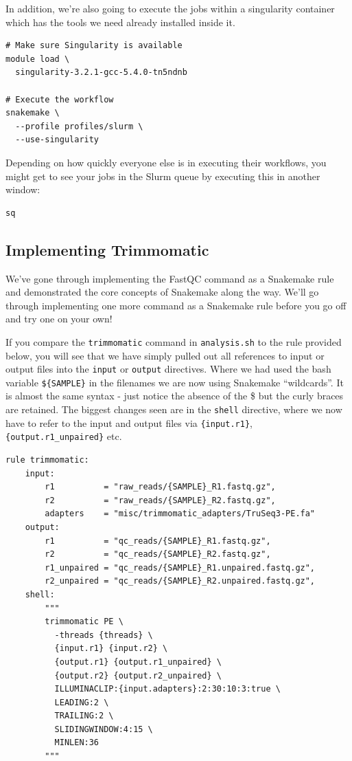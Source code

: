 In addition, we're also going to execute the jobs within a singularity container which has the tools we need already installed inside it.

\begin{lstlisting}
# Make sure Singularity is available
module load \
  singularity-3.2.1-gcc-5.4.0-tn5ndnb

# Execute the workflow
snakemake \
  --profile profiles/slurm \
  --use-singularity
\end{lstlisting}

Depending on how quickly everyone else is in executing their workflows, you might get to see your jobs in the Slurm queue by executing this in another window:

\begin{lstlisting}
sq
\end{lstlisting}

\subsection{Implementing Trimmomatic}

We've gone through implementing the FastQC command as a Snakemake rule and demonstrated the core concepts of
Snakemake along the way. We'll go through implementing one more command as a Snakemake rule before you go
off and try one on your own!

If you compare the \texttt{trimmomatic} command in \texttt{analysis.sh} to the rule provided below, you will
see that we have simply pulled out all references to input or output files into the \texttt{input} or
\texttt{output} directives. Where we had used the bash variable \texttt{\$\{SAMPLE\}} in the filenames we are now
using Snakemake ``wildcards''. It is almost the same syntax - just notice the absence of the \$ but the curly braces
are retained. The biggest changes seen are in the \texttt{shell} directive, where we now have to refer to the input
and output files via \texttt{\{input.r1\}}, \texttt{\{output.r1\_unpaired\}} etc.

\begin{lstlisting}
rule trimmomatic:
	input:
		r1          = "raw_reads/{SAMPLE}_R1.fastq.gz",
		r2          = "raw_reads/{SAMPLE}_R2.fastq.gz",
		adapters    = "misc/trimmomatic_adapters/TruSeq3-PE.fa"
	output:
		r1          = "qc_reads/{SAMPLE}_R1.fastq.gz",
		r2          = "qc_reads/{SAMPLE}_R2.fastq.gz",
		r1_unpaired = "qc_reads/{SAMPLE}_R1.unpaired.fastq.gz",
		r2_unpaired = "qc_reads/{SAMPLE}_R2.unpaired.fastq.gz",
	shell:
		"""
		trimmomatic PE \
		  -threads {threads} \
		  {input.r1} {input.r2} \
		  {output.r1} {output.r1_unpaired} \
		  {output.r2} {output.r2_unpaired} \
		  ILLUMINACLIP:{input.adapters}:2:30:10:3:true \
		  LEADING:2 \
		  TRAILING:2 \
		  SLIDINGWINDOW:4:15 \
		  MINLEN:36
		"""
\end{lstlisting}

